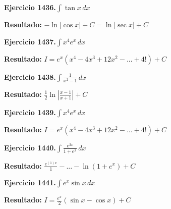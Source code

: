 \documentclass[10pt,a4paper]{article}
\begin{document}
\begin{ejbox}
\textbf{Ejercicio 1436.}\quad $\int \tan x\,dx$
\end{ejbox}

\begin{solbox}
\textbf{Resultado:} \(\displaystyle -\ln|\cos x| + C = \ln|\sec x| + C\)
\end{solbox}

\begin{ejbox}
\textbf{Ejercicio 1437.}\quad $\int x^{4} e^x\,dx$
\end{ejbox}

\begin{solbox}
\textbf{Resultado:} \(\displaystyle I = e^x(x^{4} - 4x^{3} + 12x^{2} - ... + 4!) + C\)
\end{solbox}

\newpage
\begin{ejbox}
\textbf{Ejercicio 1438.}\quad $\int \frac{1}{x^2-1}\,dx$
\end{ejbox}

\begin{solbox}
\textbf{Resultado:} \(\displaystyle \frac{1}{2}\ln\left|\frac{x-1}{x+1}\right| + C\)
\end{solbox}

\begin{ejbox}
\textbf{Ejercicio 1439.}\quad $\int x^{4} e^x\,dx$
\end{ejbox}

\begin{solbox}
\textbf{Resultado:} \(\displaystyle I = e^x(x^{4} - 4x^{3} + 12x^{2} - ... + 4!) + C\)
\end{solbox}

\begin{ejbox}
\textbf{Ejercicio 1440.}\quad $\int \frac{e^{2x}}{1+e^{x}}\,dx$
\end{ejbox}

\begin{solbox}
\textbf{Resultado:} \(\displaystyle \frac{e^{(1)x}}{1} - ... - \ln(1+e^x) + C\)
\end{solbox}

\newpage
\begin{ejbox}
\textbf{Ejercicio 1441.}\quad $\int e^x\sin x\,dx$
\end{ejbox}

\begin{solbox}
\textbf{Resultado:} \(\displaystyle I = \frac{e^x}{2}(\sin x - \cos x) + C\)
\end{solbox}
\end{document}
